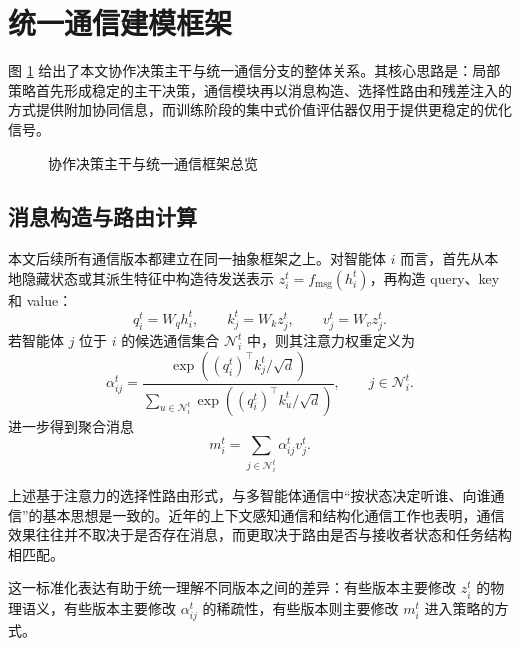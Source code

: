 \section{统一通信建模框架}

图 \ref{fig:unified_framework} 给出了本文协作决策主干与统一通信分支的整体关系。其核心思路是：局部策略首先形成稳定的主干决策，通信模块再以消息构造、选择性路由和残差注入的方式提供附加协同信息，而训练阶段的集中式价值评估器仅用于提供更稳定的优化信号。

\begin{figure}[htbp]
    \centering
    \resizebox{0.98\textwidth}{!}{}
    \caption{协作决策主干与统一通信框架总览}
    \label{fig:unified_framework}
\end{figure}

\subsection{消息构造与路由计算}

本文后续所有通信版本都建立在同一抽象框架之上。对智能体 $i$ 而言，首先从本地隐藏状态或其派生特征中构造待发送表示 $z_i^t=f_{\text{msg}}(h_i^t)$，再构造 query、key 和 value\cite{10.5555/3295222.3295349}：
\begin{equation}
q_i^t = W_q h_i^t,\qquad
k_j^t = W_k z_j^t,\qquad
v_j^t = W_v z_j^t.
\end{equation}
若智能体 $j$ 位于 $i$ 的候选通信集合 $\mathcal{N}_i^t$ 中，则其注意力权重定义为
\begin{equation}
\alpha_{ij}^t
=
\frac{\exp\left((q_i^t)^\top k_j^t / \sqrt{d}\right)}
{\sum_{u \in \mathcal{N}_i^t}
\exp\left((q_i^t)^\top k_u^t / \sqrt{d}\right)},
\qquad j \in \mathcal{N}_i^t.
\end{equation}
进一步得到聚合消息
\begin{equation}
m_i^t=\sum_{j \in \mathcal{N}_i^t}\alpha_{ij}^t v_j^t.
\end{equation}

上述基于注意力的选择性路由形式，与多智能体通信中“按状态决定听谁、向谁通信”的基本思想是一致的\cite{das2019tarmac,jiang2018attentional}。近年的上下文感知通信和结构化通信工作也表明，通信效果往往并不取决于是否存在消息，而更取决于路由是否与接收者状态和任务结构相匹配\cite{li2024cacom,sheng2023lsc}。

这一标准化表达有助于统一理解不同版本之间的差异：有些版本主要修改 $z_i^t$ 的物理语义，有些版本主要修改 $\alpha_{ij}^t$ 的稀疏性，有些版本则主要修改 $m_i^t$ 进入策略的方式。

